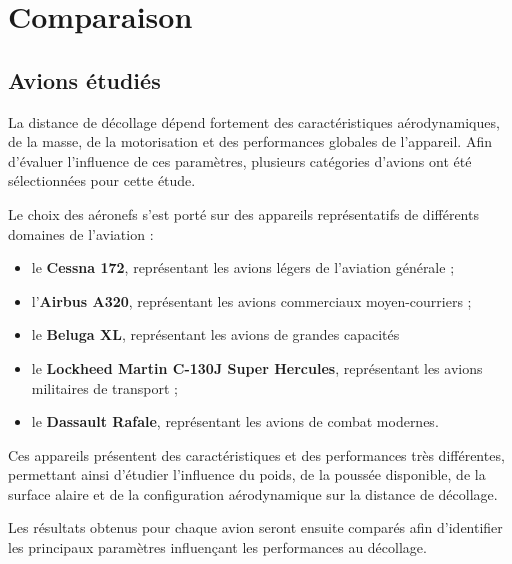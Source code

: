 

\chapter{ Comparaison    }\label{ch:structure}

\section{Avions étudiés}

	La distance de décollage dépend fortement des caractéristiques aérodynamiques, de la masse, de la motorisation et des performances globales de l'appareil. Afin d'évaluer l'influence de ces paramètres, plusieurs catégories d'avions ont été sélectionnées pour cette étude.
	
	Le choix des aéronefs s'est porté sur des appareils représentatifs de différents domaines de l'aviation :
	
	\begin{itemize}
		\item le \textbf{Cessna 172}, représentant les avions légers de l'aviation générale ;
		\item l'\textbf{Airbus A320}, représentant les avions commerciaux moyen-courriers ;
		\item le \textbf{Beluga XL}, représentant les avions de grandes capacités
		\item le \textbf{Lockheed Martin C-130J Super Hercules}, représentant les avions militaires de transport ;
		\item le \textbf{Dassault Rafale}, représentant les avions de combat modernes.
	\end{itemize}
	
	Ces appareils présentent des caractéristiques et des performances très différentes, permettant ainsi d'étudier l'influence du poids, de la poussée disponible, de la surface alaire et de la configuration aérodynamique sur la distance de décollage.
	
	Les résultats obtenus pour chaque avion seront ensuite comparés afin d'identifier les principaux paramètres influençant les performances au décollage.
	
		\vspace*{2cm}
	
